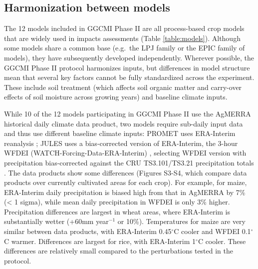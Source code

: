 \documentclass[gmd, manuscript]{copernicus} %
\begin{document}
\subsection{Harmonization between models}
The 12 models included in GGCMI Phase II are all process-based crop models that are widely used in impacts assessments (Table \ref{table:models}).
Although some models share a common base (e.g.\ the LPJ family or the EPIC family of models), they have subsequently developed independently.  
Wherever possible, the GGCMI Phase II protocol harmonizes inputs, but differences in model structure mean that several key factors cannot be fully standardized across the experiment. 
These include soil treatment (which affects soil organic matter and carry-over effects of soil moisture across growing years) and baseline climate inputs.  

While 10 of the 12 models participating in GGCMI Phase II use the AgMERRA historical daily climate data product, two models require sub-daily input data and thus use different baseline climate inputs:
PROMET uses ERA-Interim reanalysis \citep{dee2011era}; JULES uses a bias-corrected version of ERA-Interim, the 3-hour WFDEI (WATCH-Forcing-Data-ERA-Interim) \citep{weedon2014wfdei}, selecting WFDEI version with precipitation bias-corrected against the CRU TS3.101/TS3.21 precipitation totals \citep{harris_cru_2014}.
The data products show some differences (Figures S3-S4, which compare data products over currently cultivated areas for each crop). 
For example, for maize, ERA-Interim daily precipitation is biased high from that in AgMERRA by 7\% (< 1 sigma), while mean daily precipitation in WFDEI is only 3\% higher. 
Precipitation differences are largest in wheat areas, where ERA-Interim is substantially wetter (+60mm year$^{-1}$ or 10\%). 
Temperatures for maize are very similar between data products, with ERA-Interim 0.45$^\circ$C cooler and WFDEI 0.1$^\circ$C warmer. 
Differences are largest for rice, with ERA-Interim 1$^\circ$C cooler. 
These differences are relatively small compared to the perturbations tested in the protocol.
\end{document}
